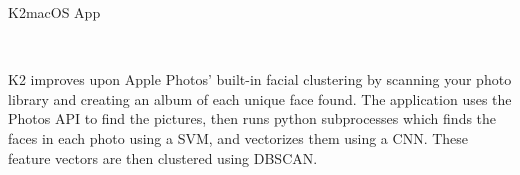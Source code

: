 \documentclass[]{style}
\begin{document}
\begin{entrylist}

\vspace{2mm}

\entry
{K2}{macOS App}
{ ~ \vspace{-2.5mm}

 

K2 improves upon Apple Photos' built-in facial clustering by scanning your photo library and creating an album of each unique face found. The application uses the Photos API to find the pictures, then runs python subprocesses which finds the faces in each photo using a SVM, and vectorizes them using a CNN. These feature vectors are then clustered using DBSCAN.}

\end{entrylist}
\end{document}
